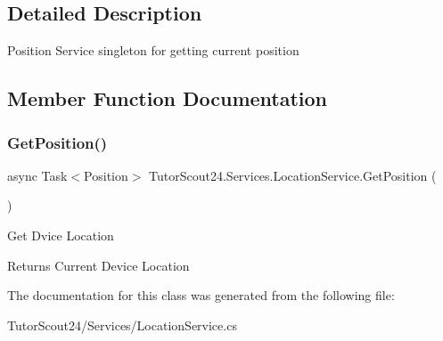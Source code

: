 \subsection{Detailed Description}
Position Service singleton for getting current position 



\subsection{Member Function Documentation}
\mbox{\label{class_tutor_scout24_1_1_services_1_1_location_service_a688f8634878e6b756de29fda502c6f7f}} 
\subsubsection{\texorpdfstring{Get\+Position()}{GetPosition()}}
{\footnotesize\ttfamily async Task$<$Position$>$ Tutor\+Scout24.\+Services.\+Location\+Service.\+Get\+Position (\begin{DoxyParamCaption}{ }\end{DoxyParamCaption})\hspace{0.3cm}{\ttfamily [inline]}}



Get Dvice Location 

\begin{DoxyReturn}{Returns}
Current Device Location
\end{DoxyReturn}


The documentation for this class was generated from the following file\+:\begin{DoxyCompactItemize}
\item 
Tutor\+Scout24/\+Services/Location\+Service.\+cs\end{DoxyCompactItemize}
